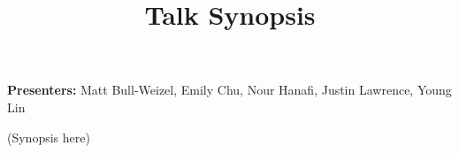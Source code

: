 \documentclass[12pt]{article}
\title{Talk Synopsis}
\begin{document}
\maketitle

\textbf{Presenters:} Matt Bull-Weizel, Emily Chu, Nour Hanafi, Justin Lawrence, Young Lin

(Synopsis here)
\end{document}
